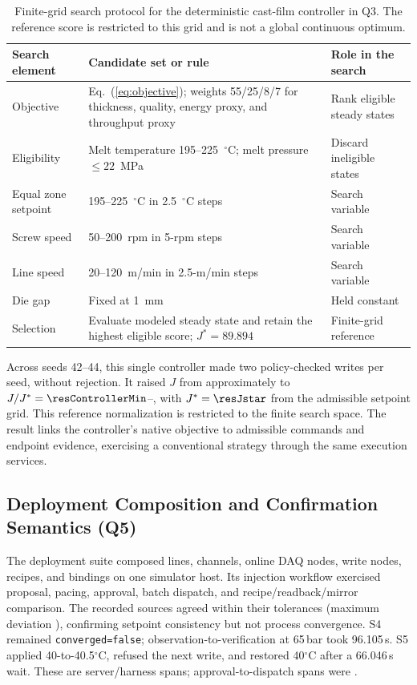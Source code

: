 \begin{table}[!t]
\centering
\caption{Finite-grid search protocol for the deterministic cast-film
controller in Q3. The reference score is restricted to this grid and is not
a global continuous optimum.}
\label{tab:q3search}
\footnotesize
\setlength{\tabcolsep}{4pt}
\begin{tabularx}{\textwidth}{@{}p{2.4cm}Xp{3.0cm}@{}}
\toprule
Search element & Candidate set or rule & Role in the search \\
\midrule
Objective & Eq.~(\ref{eq:objective}); weights 55/25/8/7 for thickness,
quality, energy proxy, and throughput proxy & Rank eligible steady states \\
Eligibility & Melt temperature 195--225~$^{\circ}$C; melt pressure
$\leq 22$~MPa & Discard ineligible states \\
Equal zone setpoint & 195--225~$^{\circ}$C in 2.5~$^{\circ}$C steps & Search variable \\
Screw speed & 50--200~rpm in 5-rpm steps & Search variable \\
Line speed & 20--120~m/min in 2.5-m/min steps & Search variable \\
Die gap & Fixed at 1~mm & Held constant \\
Selection & Evaluate modeled steady state and retain the highest eligible
score; $J^{*}=89.894$ & Finite-grid reference \\
\bottomrule
\end{tabularx}
\end{table}

Across seeds 42--44, this single controller made two policy-checked writes per
seed, without rejection. It raised $J$ from approximately
\resJzero{} to $J/J^*=\resControllerMin$--\resControllerMax{}, with
$J^*=\resJstar$ from the admissible setpoint grid. This reference
normalization is restricted to the finite search space.
The result links the controller's native objective to admissible commands
and endpoint evidence, exercising a conventional strategy through the
same execution services.

\subsection{Deployment Composition and Confirmation Semantics (Q5)}
\label{sec:hardening}
The deployment suite composed \resLinesLive{} lines, \resChannelsLive{}
channels, \resDaqOnline{} online DAQ nodes, \resWriteNodesLive{} write nodes,
\resRecipesLive{} recipes, and \resBindingsLive{} bindings on one simulator
host. Its injection workflow exercised proposal, pacing, approval, batch
dispatch, and recipe/readback/mirror comparison. The recorded sources agreed
within their tolerances (maximum deviation \resConsistencyErr{}), confirming
setpoint consistency but not process convergence. S4 remained
\texttt{converged=false}; observation-to-verification at 65\,bar took
96.105\,s. S5 applied 40-to-40.5$^{\circ}$C, refused the next write, and
restored 40$^{\circ}$C after a 66.046\,s wait. These are server/harness spans; approval-to-dispatch spans
were \resHitlDispatchMs{}.


